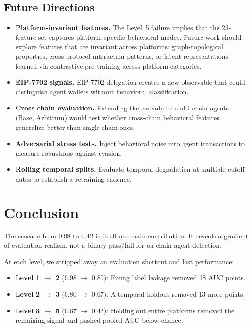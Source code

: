 \documentclass[sigconf,nonacm=false]{acmart}
\begin{document}
\subsection{Future Directions}

\begin{itemize}
    \item \textbf{Platform-invariant features.} The Level~5 failure implies that the 23-feature set captures platform-specific behavioral modes. Future work should explore features that are invariant across platforms: graph-topological properties, cross-protocol interaction patterns, or latent representations learned via contrastive pre-training across platform categories.
    \item \textbf{EIP-7702 signals.} EIP-7702 delegation creates a new observable that could distinguish agent wallets without behavioral classification.
    \item \textbf{Cross-chain evaluation.} Extending the cascade to multi-chain agents (Base, Arbitrum) would test whether cross-chain behavioral features generalize better than single-chain ones.
    \item \textbf{Adversarial stress tests.} Inject behavioral noise into agent transactions to measure robustness against evasion.
    \item \textbf{Rolling temporal splits.} Evaluate temporal degradation at multiple cutoff dates to establish a retraining cadence.
\end{itemize}


\section{Conclusion}

The cascade from 0.98 to 0.42 is itself our main contribution. It reveals a gradient of evaluation realism, not a binary pass/fail for on-chain agent detection.

At each level, we stripped away an evaluation shortcut and lost performance:

\begin{itemize}
    \item \textbf{Level 1 $\to$ 2} (0.98 $\to$ 0.80): Fixing label leakage removed 18 AUC points.
    \item \textbf{Level 2 $\to$ 3} (0.80 $\to$ 0.67): A temporal holdout removed 13 more points.
    \item \textbf{Level 3 $\to$ 5} (0.67 $\to$ 0.42): Holding out entire platforms removed the remaining signal and pushed pooled AUC below chance.
\end{itemize}
\end{document}
